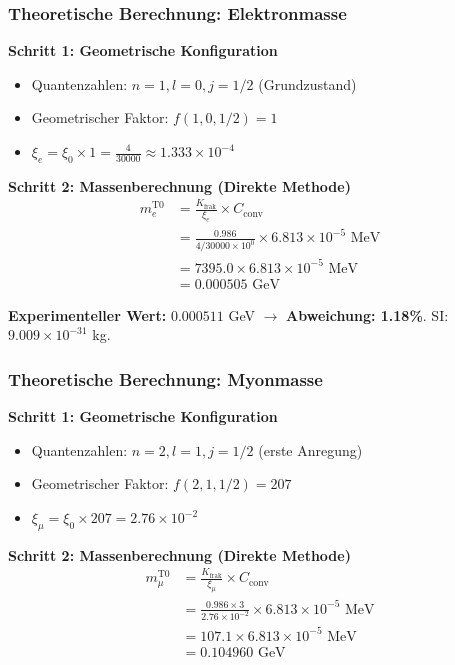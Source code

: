 	\subsubsection{Theoretische Berechnung: Elektronmasse}
	
	\textbf{Schritt 1: Geometrische Konfiguration}
	\begin{itemize}
		\item Quantenzahlen: $n=1, l=0, j=1/2$ (Grundzustand)
		\item Geometrischer Faktor: $f(1,0,1/2) = 1$
		\item $\xi_e = \xi_0 \times 1 = \frac{4}{30000} \approx 1.333 \times 10^{-4}$
	\end{itemize}
	
	\textbf{Schritt 2: Massenberechnung (Direkte Methode)}
	\begin{align}
		m_e^{\text{T0}} &= \frac{K_{\text{frak}}}{\xi_e} \times C_{\text{conv}} \\
		&= \frac{0.986}{4/30000 \times 10^{0}} \times 6.813 \times 10^{-5} \text{ MeV} \\
		&= 7395.0 \times 6.813 \times 10^{-5} \text{ MeV} \\
		&= 0.000505 \text{ GeV}
	\end{align}
	
	\textbf{Experimenteller Wert:} $0.000511$ GeV $\rightarrow$ \textbf{Abweichung: 1.18\%}. SI: $9.009 \times 10^{-31}$ kg.
	
	\subsubsection{Theoretische Berechnung: Myonmasse}
	
	\textbf{Schritt 1: Geometrische Konfiguration}
	\begin{itemize}
		\item Quantenzahlen: $n=2, l=1, j=1/2$ (erste Anregung)
		\item Geometrischer Faktor: $f(2,1,1/2) = 207$
		\item $\xi_\mu = \xi_0 \times 207 = 2.76 \times 10^{-2}$
	\end{itemize}
	
	\textbf{Schritt 2: Massenberechnung (Direkte Methode)}
	\begin{align}
		m_\mu^{\text{T0}} &= \frac{K_{\text{frak}}}{\xi_\mu} \times C_{\text{conv}} \\
		&= \frac{0.986 \times 3}{2.76 \times 10^{-2}} \times 6.813 \times 10^{-5} \text{ MeV} \\
		&= 107.1 \times 6.813 \times 10^{-5} \text{ MeV} \\
		&= 0.104960 \text{ GeV}
	\end{align}
	
